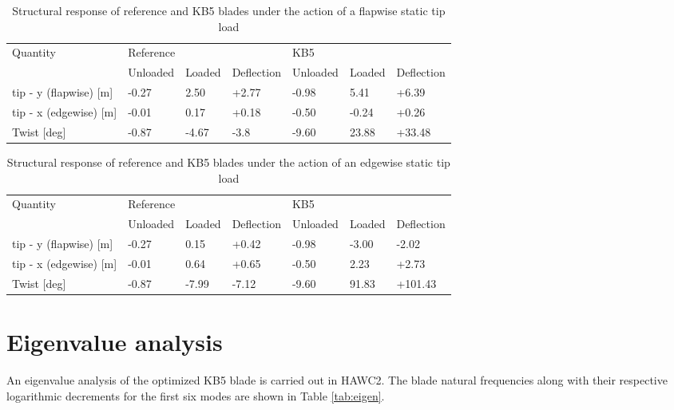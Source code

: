 \begin{table}[pth]
\centering
\caption{Structural response of reference and KB5 blades under the action of a flapwise static tip load}
\label{tab:flap_static_load_test}
\begin{tabular}{|l|l|l|l|l|l|l|}
\hline
\multirow{2}{*}{Quantity}  & \multicolumn{3}{l|}{Reference} & \multicolumn{3}{l|}{KB5}       \\ \cline{2-7} 
                           & Unloaded & Loaded & Deflection & Unloaded & Loaded & Deflection \\ \hline
tip - y (flapwise) {[}m{]} & -0.27    & 2.50   & +2.77      & -0.98    & 5.41   & +6.39      \\
tip - x (edgewise) {[}m{]} & -0.01    & 0.17   & +0.18      & -0.50    & -0.24  & +0.26      \\
Twist {[}deg{]}            & -0.87    & -4.67  & -3.8       & -9.60    & 23.88  & +33.48      \\ \hline
\end{tabular}
\end{table}

\begin{table}[pth]
\centering
\caption{Structural response of reference and KB5 blades under the action of an edgewise static tip load}
\label{tab:edge_static_load_test}
\begin{tabular}{|l|l|l|l|l|l|l|}
\hline
\multirow{2}{*}{Quantity}  & \multicolumn{3}{l|}{Reference} & \multicolumn{3}{l|}{KB5}       \\ \cline{2-7} 
                           & Unloaded & Loaded & Deflection & Unloaded & Loaded & Deflection \\ \hline
tip - y (flapwise) {[}m{]} & -0.27    & 0.15   & +0.42      & -0.98    & -3.00   & -2.02      \\
tip - x (edgewise) {[}m{]} & -0.01    & 0.64   & +0.65      & -0.50    & 2.23  & +2.73      \\
Twist {[}deg{]}            & -0.87    & -7.99  & -7.12      & -9.60    & 91.83  & +101.43      \\ \hline
\end{tabular}
\end{table}

\section{Eigenvalue analysis}
\label{sec:eigen}
An eigenvalue analysis of the optimized KB5 blade is carried out in HAWC2. The blade natural frequencies along with their respective logarithmic decrements for the first six modes are shown in Table \ref{tab:eigen}.

